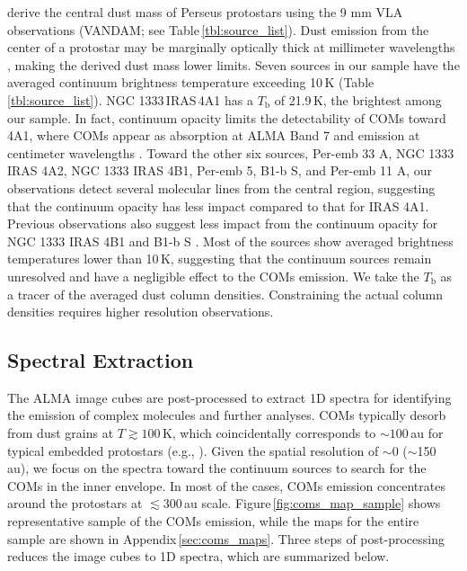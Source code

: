 \documentclass[twocolumn]{aastex62}
\begin{document}
\citet{2020arXiv200602812T} derive the central dust mass of Perseus protostars using the 9 mm VLA observations (VANDAM; see Table\,\ref{tbl:source_list}).  Dust emission from the center of a protostar may be marginally optically thick at millimeter wavelengths \citep{2020ApJ...889..172K}, making the derived dust mass lower limits.  Seven sources in our sample have the averaged continuum brightness temperature exceeding 10\,K (Table\,\ref{tbl:source_list}).  NGC 1333\,IRAS\,4A1 has a $T_\text{b}$ of 21.9\,K, the brightest among our sample.  In fact, continuum opacity limits the detectability of COMs toward 4A1, where COMs appear as absorption at ALMA Band 7 \citep{2019ApJ...872..196S} and emission at centimeter wavelengths \citep{2020ApJ...896L...3D}.  Toward the other six sources, Per-emb 33 A, NGC 1333 IRAS 4A2, NGC 1333 IRAS 4B1, Per-emb 5, B1-b S, and Per-emb 11 A, our observations detect several molecular lines from the central region, suggesting that the continuum opacity has less impact compared to that for IRAS 4A1.  Previous observations also suggest less impact from the continuum opacity for NGC 1333 IRAS 4B1 \citep{2020A&A...635A.198B} and B1-b S \citep{2018A&A...620A..80M}.  Most of the sources show averaged brightness temperatures lower than 10\,K, suggesting that the continuum sources remain unresolved and have a negligible effect to the COMs emission.  We take the $T_\text{b}$ as a tracer of the averaged dust column densities.  Constraining the actual column densities requires higher resolution observations.


\subsection{Spectral Extraction}
The ALMA image cubes are post-processed to extract 1D spectra for identifying the emission of complex molecules and further analyses.  COMs typically desorb from dust grains at $T \gtrsim 100$\,K, which coincidentally corresponds to $\sim 100$\,au for typical embedded protostars (e.g., \citealt{2020ApJ...891...61Y}).  Given the spatial resolution of $\sim$0 ($\sim$150\,au), we focus on the spectra toward the continuum sources to search for the COMs in the inner envelope.  In most of the cases, COMs emission concentrates around the protostars at $\lesssim$300\,au scale.  Figure\,\ref{fig:coms_map_sample} shows representative sample of the COMs emission, while the maps for the entire sample are shown in Appendix\,\ref{sec:coms_maps}.  Three steps of post-processing reduces the image cubes to 1D spectra, which are summarized below.
\end{document}
